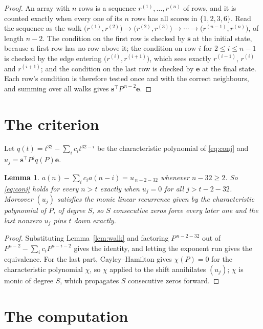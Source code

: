 \documentclass[11pt,a4paper]{article}
\theoremstyle{plain}
\newtheorem{lemma}[theorem]{Lemma}
\theoremstyle{definition}
\begin{document}
\begin{proof}
An array with $n$ rows is a sequence $r^{(1)},\dots,r^{(n)}$ of rows, and it is counted
exactly when every one of its $n$ rows has all scores in $\{1,2,3,6\}$. Read the sequence as the
walk $\bigl(r^{(1)},r^{(2)}\bigr)\to\bigl(r^{(2)},r^{(3)}\bigr)\to\cdots\to
\bigl(r^{(n-1)},r^{(n)}\bigr)$, of length $n-2$. The condition on the first row is
checked by $\mathbf{s}$ at the initial state, because a first row has no row above it; the
condition on row $i$ for $2\le i\le n-1$ is checked by the edge entering
$\bigl(r^{(i)},r^{(i+1)}\bigr)$, which sees exactly $r^{(i-1)}$, $r^{(i)}$ and
$r^{(i+1)}$; and the condition on the last row is checked by $\mathbf{e}$ at the final
state. Each row's condition is therefore tested once and with the correct neighbours, and
summing over all walks gives $\mathbf{s}^{\!\top}P^{\,n-2}\mathbf{e}$.
\end{proof}

\section{The criterion}

Let $q(t)=t^{32}-\sum_i c_i t^{32-i}$ be the characteristic polynomial of
\eqref{eq:conj} and $u_j=\mathbf{s}^{\!\top}P^{j}q(P)\mathbf{e}$.

\begin{lemma}\label{lem:crit}
$a(n)-\sum_i c_i a(n-i)=u_{\,n-2-32}$ whenever $n-32\ge2$. So \eqref{eq:conj}
holds for every $n>t$ exactly when $u_j=0$ for all $j>t-2-32$. Moreover $(u_j)$
satisfies the monic linear recurrence given by the characteristic polynomial of $P$, of
degree $S$, so $S$ consecutive zeros force every later one and the last nonzero $u_j$ pins
$t$ down exactly.
\end{lemma}

\begin{proof}
Substituting Lemma~\ref{lem:walk} and factoring $P^{\,n-2-32}$ out of
$P^{n-2}-\sum_i c_i P^{n-i-2}$ gives the identity, and letting the exponent run gives the
equivalence. For the last part, Cayley--Hamilton gives $\chi(P)=0$ for the characteristic
polynomial $\chi$, so $\chi$ applied to the shift annihilates $(u_j)$; $\chi$ is monic of
degree $S$, which propagates $S$ consecutive zeros forward.
\end{proof}

\section{The computation}
\end{document}

